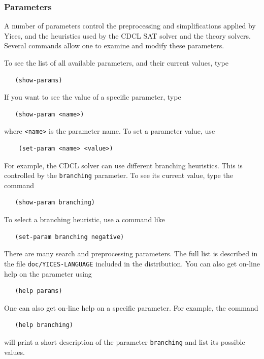 \documentclass[11pt,twoside,fleqn,openright,titlepage]{cslreport}
\begin{document}
\subsubsection*{Parameters}

A number of parameters control the preprocessing and simplifications
applied by Yices, and the heuristics used by the CDCL SAT solver and the
theory solvers. Several commands allow one to examine and modify these
parameters.

\medskip\noindent
To see the list of all available parameters, and their current values, type
\begin{small}
\begin{verbatim}
   (show-params)
\end{verbatim}
\end{small}
If you want to see the value of a specific parameter, type
\begin{small}
\begin{verbatim}
   (show-param <name>)
\end{verbatim}
\end{small}
where \texttt{<name>} is the parameter name. To set a parameter value, use
\begin{small}
\begin{verbatim}
    (set-param <name> <value>)
\end{verbatim}
\end{small}
For example, the CDCL solver can use different branching
heuristics. This is controlled by the \texttt{branching} parameter. To
see its current value, type the command
\begin{small}
\begin{verbatim}
   (show-param branching)
\end{verbatim}
\end{small}
To select a branching heuristic, use a command like
\begin{small}
\begin{verbatim}
   (set-param branching negative)
\end{verbatim}
\end{small}

\medskip\noindent
There are many search and preprocessing parameters. The full list is
described in the file \texttt{doc/YICES-LANGUAGE} included in the
distribution. You can also get on-line help on the parameter using
\begin{small}
\begin{verbatim}
   (help params)
\end{verbatim}
\end{small}
One can also get on-line help on a specific parameter. For example,
the command
\begin{small}
\begin{verbatim}
   (help branching)
\end{verbatim}
\end{small}
will print a short description of the parameter \texttt{branching} and
list its possible values.
\end{document}
